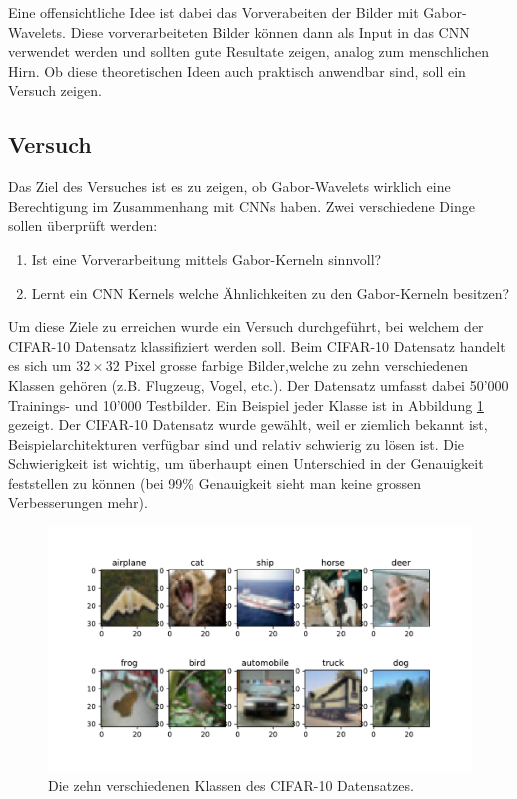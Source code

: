 Eine offensichtliche Idee ist dabei das Vorverabeiten der Bilder mit Gabor-Wavelets.
Diese vorverarbeiteten Bilder können dann als Input in das CNN verwendet werden und sollten gute Resultate zeigen, analog zum menschlichen Hirn.
Ob diese theoretischen Ideen auch praktisch anwendbar sind, soll ein Versuch zeigen.

\subsection{Versuch}

Das Ziel des Versuches ist es zu zeigen, ob Gabor-Wavelets wirklich eine Berechtigung im Zusammenhang mit CNNs haben.
Zwei verschiedene Dinge sollen überprüft werden:
\begin{enumerate}
	\item Ist eine Vorverarbeitung mittels Gabor-Kerneln sinnvoll?
	\item Lernt ein CNN Kernels welche Ähnlichkeiten zu den Gabor-Kerneln besitzen?
\end{enumerate}
Um diese Ziele zu erreichen wurde ein Versuch durchgeführt, bei welchem der CIFAR-10 \cite{paper:cifar10} Datensatz klassifiziert werden soll.
Beim CIFAR-10 Datensatz handelt es sich um $32 \times 32$ Pixel grosse farbige Bilder,welche zu zehn verschiedenen Klassen gehören (z.B. Flugzeug, Vogel, etc.).
Der Datensatz umfasst dabei 50'000 Trainings- und 10'000 Testbilder.
Ein Beispiel jeder Klasse ist in Abbildung \ref{fig:cifar10} gezeigt.
Der CIFAR-10 Datensatz wurde gewählt, weil er ziemlich bekannt ist, Beispielarchitekturen verfügbar sind und relativ schwierig zu lösen ist.
Die Schwierigkeit ist wichtig, um überhaupt einen Unterschied in der Genauigkeit feststellen zu können (bei 99\% Genauigkeit sieht man keine grossen Verbesserungen mehr).

\begin{figure}
	\centering
	\includegraphics[width=0.6\linewidth, trim=0 60 0 40, clip]{./papers/visuell/images/cifar10}
	\caption{Die zehn verschiedenen Klassen des CIFAR-10 Datensatzes.}
	\label{fig:cifar10}
\end{figure}

